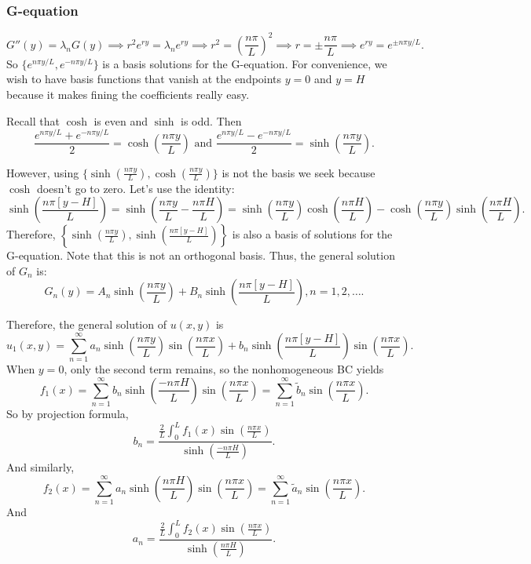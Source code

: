 \documentclass[class=article,crop=false]{standalone}
\begin{document}
\subsubsection{G-equation}
\[
	G''(y)=\lambda_n G(y) \implies r^2e^{ry}=\lambda_n e^{ry} \implies r^2 = \left( \frac{n \pi}{L} \right)^2 \implies r=\pm \frac{n\pi}{L }\implies e^{ry}=e^{\pm n\pi y / L} 
.\]
So $ \{e^{n\pi y/L}, e^{-n \pi y/L}\} $ is a basis solutions for the G-equation. For convenience, we wish to have basis functions that vanish at the endpoints $ y=0$ and  $ y=H$ because it makes fining the coefficients really easy.

Recall that $ \cosh$ is even and $ \sinh $ is odd. Then
\[
	\frac{e^{n\pi y /L}+ e^{-n\pi y /L}}{2 }= \cosh\left( \frac{n \pi y}{L } \right) \text{ and } \frac{e^{n \pi y /L}- e^{-n \pi y /L}}{2 }= \sinh\left( \frac{n\pi y}{L } \right)  
.\]

However, using $ \{\sinh\left( \frac{n\pi y}{L } \right), \cosh\left( \frac{n \pi y}{L } \right)  \} $ is not the basis we seek because $ \cosh$ doesn't go to zero. Let's use the identity:
\[
	\sinh\left( \frac{n \pi [y-H]}{L } \right)= \sinh\left( \frac{n\pi y}{L } - \frac{n\pi H}{L } \right) = \sinh\left( \frac{n\pi y}{L } \right)  \cosh\left( \frac{n\pi H}{L } \right) - \cosh\left( \frac{n\pi y}{L } \right) \sinh\left( \frac{n\pi H}{L } \right)  
.\] 
Therefore, $ \left\{ \sinh\left( \frac{n\pi y}{L } \right) , \sinh\left( \frac{n\pi [y-H]}{L } \right)  \right\}  $ is also a basis of solutions for the G-equation. Note that this is not an orthogonal basis. Thus, the general solution of $ G_n$ is:
\[
	G_n(y) = A_n \sinh\left( \frac{n\pi y}{L } \right) + B_n \sinh\left( \frac{n\pi [y-H]}{L } \right) , n=1,2,\ldots
.\] 

Therefore, the general solution of $ u(x,y)$ is
 \[
	 u_1(x,y) = \sum_{ n= 1}^{\infty} a_n \sinh \left( \frac{ n\pi y}{ L} \right) \sin \left( \frac{ n\pi x}{ L} \right) + b_n \sinh \left( \frac{ n\pi [y-H]}{ L} \right) \sin \left( \frac{ n\pi x}{ L} \right) 
.\] 
When $ y=0$, only the second term remains, so the nonhomogeneous BC yields
 \[
	 f_1(x) = \sum_{ n= 1}^{\infty} b_n \sinh \left( \frac{- n\pi H}{ L} \right) \sin \left( \frac{ n\pi x}{ L} \right) = \sum_{ n= 1}^{\infty} \tilde{ b}_n \sin \left( \frac{ n\pi x}{ L} \right)  
.\]
So by projection formula,
\[
	 b_n = \frac{ \frac{2}{L} \int_{0}^{L} f_1(x) \sin \left( \frac{ n\pi x}{ L} \right)  }{ \sinh \left( \frac{ -n\pi H}{ L} \right) } 
.\] 
And similarly, 
 \[
	 f_2(x) = \sum_{ n= 1}^{\infty} a_n \sinh \left( \frac{ n\pi H}{ L} \right) \sin \left( \frac{ n\pi x}{ L} \right)  = \sum_{ n= 1}^{\infty} \tilde{ a}_n \sin \left( \frac{ n\pi x}{ L} \right)  
.\] 
And
\[
a_n = \frac{\frac{2}{L} \int_{0}^{L} f_2(x) \sin \left( \frac{ n\pi x}{ L} \right)  }{\sinh \left( \frac{ n\pi H}{ L} \right)  } 
.\] 
\end{document}
